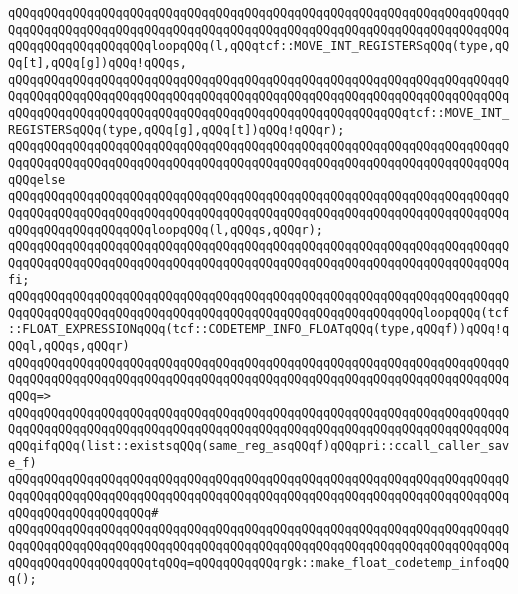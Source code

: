 \newline
\verb|qQQqqQQqqQQqqQQqqQQqqQQqqQQqqQQqqQQqqQQqqQQqqQQqqQQqqQQqqQQqqQQqqQQqqQQqqQQqqQQqqQQqqQQqqQQqqQQqqQQqqQQqqQQqqQQqqQQqqQQqqQQqqQQqqQQqqQQqqQQqqQQqqQQqqQQqqQQqqQQqloopqQQq(l,qQQqtcf::MOVE_INT_REGISTERSqQQq(type,qQQq[t],qQQq[g])qQQq!qQQqs,|\newline
\verb|qQQqqQQqqQQqqQQqqQQqqQQqqQQqqQQqqQQqqQQqqQQqqQQqqQQqqQQqqQQqqQQqqQQqqQQqqQQqqQQqqQQqqQQqqQQqqQQqqQQqqQQqqQQqqQQqqQQqqQQqqQQqqQQqqQQqqQQqqQQqqQQqqQQqqQQqqQQqqQQqqQQqqQQqqQQqqQQqqQQqqQQqqQQqqQQqqQQqtcf::MOVE_INT_REGISTERSqQQq(type,qQQq[g],qQQq[t])qQQq!qQQqr);|\newline
\newline
\verb|qQQqqQQqqQQqqQQqqQQqqQQqqQQqqQQqqQQqqQQqqQQqqQQqqQQqqQQqqQQqqQQqqQQqqQQqqQQqqQQqqQQqqQQqqQQqqQQqqQQqqQQqqQQqqQQqqQQqqQQqqQQqqQQqqQQqqQQqqQQqqQQqelse|\newline
\verb|qQQqqQQqqQQqqQQqqQQqqQQqqQQqqQQqqQQqqQQqqQQqqQQqqQQqqQQqqQQqqQQqqQQqqQQqqQQqqQQqqQQqqQQqqQQqqQQqqQQqqQQqqQQqqQQqqQQqqQQqqQQqqQQqqQQqqQQqqQQqqQQqqQQqqQQqqQQqqQQqloopqQQq(l,qQQqs,qQQqr);|\newline
\verb|qQQqqQQqqQQqqQQqqQQqqQQqqQQqqQQqqQQqqQQqqQQqqQQqqQQqqQQqqQQqqQQqqQQqqQQqqQQqqQQqqQQqqQQqqQQqqQQqqQQqqQQqqQQqqQQqqQQqqQQqqQQqqQQqqQQqqQQqqQQqfi;|\newline
\newline
\verb|qQQqqQQqqQQqqQQqqQQqqQQqqQQqqQQqqQQqqQQqqQQqqQQqqQQqqQQqqQQqqQQqqQQqqQQqqQQqqQQqqQQqqQQqqQQqqQQqqQQqqQQqqQQqqQQqqQQqqQQqqQQqqQQqloopqQQq(tcf::FLOAT_EXPRESSIONqQQq(tcf::CODETEMP_INFO_FLOATqQQq(type,qQQqf))qQQq!qQQql,qQQqs,qQQqr)|\newline
\verb|qQQqqQQqqQQqqQQqqQQqqQQqqQQqqQQqqQQqqQQqqQQqqQQqqQQqqQQqqQQqqQQqqQQqqQQqqQQqqQQqqQQqqQQqqQQqqQQqqQQqqQQqqQQqqQQqqQQqqQQqqQQqqQQqqQQqqQQqqQQqqQQq=>|\newline
\verb|qQQqqQQqqQQqqQQqqQQqqQQqqQQqqQQqqQQqqQQqqQQqqQQqqQQqqQQqqQQqqQQqqQQqqQQqqQQqqQQqqQQqqQQqqQQqqQQqqQQqqQQqqQQqqQQqqQQqqQQqqQQqqQQqqQQqqQQqqQQqqQQqifqQQq(list::existsqQQq(same_reg_asqQQqf)qQQqpri::ccall_caller_save_f)|\newline
\verb|qQQqqQQqqQQqqQQqqQQqqQQqqQQqqQQqqQQqqQQqqQQqqQQqqQQqqQQqqQQqqQQqqQQqqQQqqQQqqQQqqQQqqQQqqQQqqQQqqQQqqQQqqQQqqQQqqQQqqQQqqQQqqQQqqQQqqQQqqQQqqQQqqQQqqQQqqQQqqQQq#|\newline
\verb|qQQqqQQqqQQqqQQqqQQqqQQqqQQqqQQqqQQqqQQqqQQqqQQqqQQqqQQqqQQqqQQqqQQqqQQqqQQqqQQqqQQqqQQqqQQqqQQqqQQqqQQqqQQqqQQqqQQqqQQqqQQqqQQqqQQqqQQqqQQqqQQqqQQqqQQqqQQqqQQqtqQQq=qQQqqQQqqQQqrgk::make_float_codetemp_infoqQQq();|\newline
